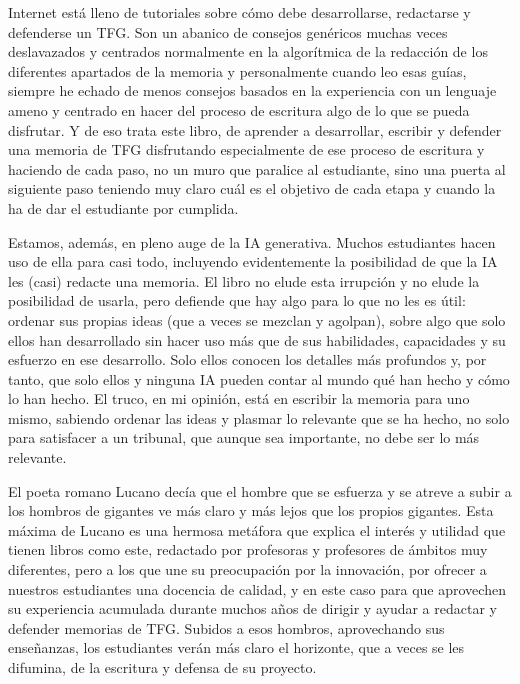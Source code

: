 Internet está lleno de tutoriales sobre cómo debe desarrollarse, redactarse y defenderse un TFG. Son un abanico de consejos genéricos muchas veces deslavazados y centrados normalmente en la algorítmica de la redacción de los diferentes apartados de la memoria y personalmente cuando leo esas guías, siempre he echado de menos consejos basados en la experiencia con un lenguaje ameno y centrado en hacer del proceso de escritura algo de lo que se pueda disfrutar. Y de eso trata este libro, de aprender a desarrollar, escribir y defender una memoria de TFG disfrutando especialmente de ese proceso de escritura y haciendo de cada paso, no un muro que paralice al estudiante, sino una puerta al siguiente paso teniendo muy claro cuál es el objetivo de cada etapa y cuando la ha de dar el estudiante por cumplida.

Estamos, además, en pleno auge de la IA generativa. Muchos estudiantes hacen uso de ella para casi todo, incluyendo evidentemente la posibilidad de que la IA les (casi) redacte una memoria. El libro no elude esta irrupción y no elude la posibilidad de usarla, pero defiende que hay algo para lo que no les es útil: ordenar sus propias ideas (que  a veces se mezclan y agolpan), sobre algo que solo ellos han desarrollado sin hacer uso más que de sus habilidades, capacidades y su esfuerzo en ese desarrollo.  Solo ellos conocen los detalles más profundos y, por tanto, que solo ellos y ninguna IA pueden contar al mundo qué han hecho y cómo lo han hecho.  El truco, en mi opinión, está en escribir la memoria para uno mismo, sabiendo ordenar las ideas y plasmar lo relevante que se ha hecho, no solo para satisfacer a un tribunal, que aunque sea importante, no debe ser lo más relevante.

El poeta romano Lucano decía que el hombre que se esfuerza y se atreve a subir a los hombros de gigantes ve más claro y más lejos que los propios gigantes. Esta máxima de Lucano es una hermosa metáfora que explica el interés y utilidad que tienen libros como este, redactado por profesoras y profesores de ámbitos muy diferentes, pero a los que une su preocupación por la innovación, por ofrecer a nuestros estudiantes una docencia de calidad, y en este caso para que aprovechen su experiencia acumulada durante muchos años de dirigir y ayudar a redactar y defender memorias de TFG. Subidos a esos hombros, aprovechando sus enseñanzas, los estudiantes verán más claro el horizonte, que a veces se les difumina, de la escritura y defensa de su proyecto. 

